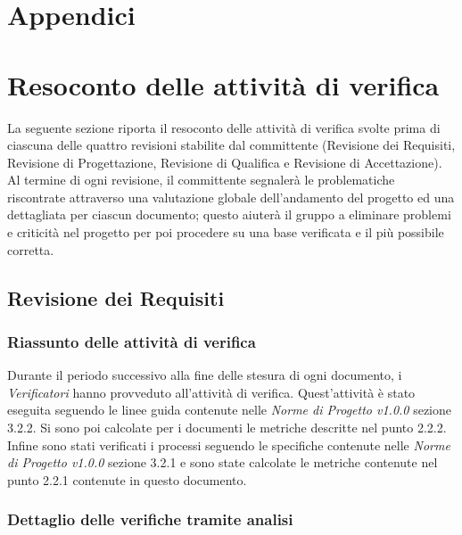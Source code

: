 \appendix
{}
\section*{Appendici}
\section{Resoconto delle attività di verifica}
La seguente sezione riporta il resoconto delle attività di verifica svolte prima di ciascuna delle quattro revisioni stabilite dal committente (Revisione dei Requisiti, Revisione di Progettazione, Revisione di Qualifica e Revisione di Accettazione).
Al termine di ogni revisione, il committente segnalerà le problematiche riscontrate attraverso una valutazione globale dell'andamento del progetto ed una dettagliata per ciascun documento; questo aiuterà il gruppo a eliminare problemi e criticità nel progetto per poi procedere su una base verificata e il più possibile corretta.

\subsection{Revisione dei Requisiti}
\subsubsection{Riassunto delle attività di verifica} 
Durante il periodo successivo alla fine delle stesura di ogni documento, i \emph{Verificatori}  hanno provveduto all'attività di verifica. Quest'attività è stato eseguita seguendo le linee guida contenute nelle \emph{Norme di Progetto v1.0.0} sezione 3.2.2.
Si sono poi calcolate per i documenti le metriche descritte nel punto 2.2.2.
Infine sono stati verificati i processi seguendo le specifiche contenute nelle \emph{Norme di Progetto v1.0.0} sezione 3.2.1 e sono state calcolate le metriche contenute nel punto 2.2.1 contenute in questo documento.
\subsubsection{Dettaglio delle verifiche tramite analisi} 
